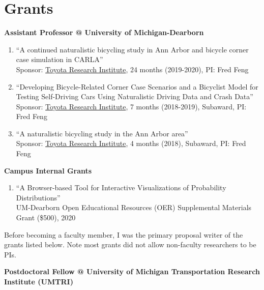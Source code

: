 \documentclass[11pt]{article}
\newenvironment{main}
{\begin{adjustwidth}{3em}{}}
{\end{adjustwidth}}
\begin{document}
\section*{Grants}
\begin{main}

\textbf{Assistant Professor @ University of Michigan-Dearborn}

\begin{enumerate}
    \item “A continued naturalistic bicycling study in Ann Arbor and bicycle corner case simulation in CARLA” \\
        Sponsor: \href{https://www.tri.global/}{Toyota Research Institute}, 24 months (2019-2020), PI: Fred Feng
    \item “Developing Bicycle-Related Corner Case Scenarios and a Bicyclist Model for Testing Self-Driving Cars Using Naturalistic Driving Data and Crash Data” \\
        Sponsor: \href{https://www.tri.global/}{Toyota Research Institute}, 7 months (2018-2019), Subaward, PI: Fred Feng
    \item “A naturalistic bicycling study in the Ann Arbor area” \\
        Sponsor: \href{https://www.tri.global/}{Toyota Research Institute}, 4 months (2018), Subaward, PI: Fred Feng

    \end{enumerate}

\textbf{Campus Internal Grants}
\begin{enumerate}
    \item “A Browser-based Tool for Interactive Visualizations of Probability Distributions” \\
        UM-Dearborn Open Educational Resources (OER) Supplemental Materials Grant (\$500), 2020
\end{enumerate}

Before becoming a faculty member, I was the primary proposal writer of the grants listed below. Note most grants did not allow non-faculty researchers to be PIs.

\textbf{Postdoctoral Fellow @ University of Michigan Transportation Research Institute (UMTRI)}


\end{main}
\end{document}
